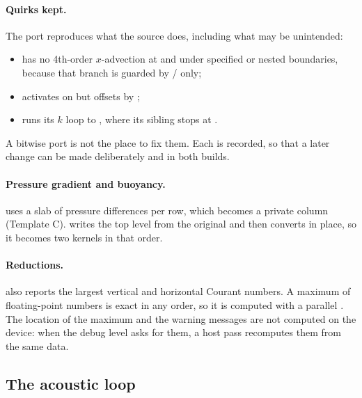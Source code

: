 \paragraph{Quirks kept.} The port reproduces what the source does, including what may be unintended:
\begin{itemize}
  \item {} has no 4th-order $x$-advection at  and  under specified or nested
    boundaries, because that branch is guarded by / only;
  \item {} activates on  but offsets by ;
  \item {} runs its $k$ loop to , where its sibling  stops at .
\end{itemize}
A bitwise port is not the place to fix them. Each is recorded, so that a later change can be made deliberately and
in both builds.

\paragraph{Pressure gradient and buoyancy.}  uses a slab of pressure differences
per row, which becomes a private column (Template C).  writes the top level from the original
 and then converts  in place, so it becomes two kernels in that order.

\paragraph{Reductions.}  also reports the largest vertical and horizontal Courant numbers. A maximum of
floating-point numbers is exact in any order, so it is computed with a parallel . The location of
the maximum and the warning messages are not computed on the device: when the debug level asks for them, a host pass
recomputes them from the same data.

\subsection{The acoustic loop}

